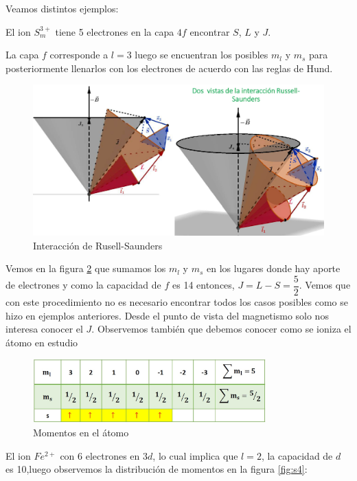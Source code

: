 Veamos distintos ejemplos:

El ion $S_{m}^{3+}$ tiene 5 electrones en la capa $4f$ encontrar $S$, $L$ y $J$.

La capa $f$ corresponde a $l=3$ luego se encuentran los posibles $m_{l}$ y $m_{s}$ para
posteriormente llenarlos con los electrones de acuerdo con las reglas de Hund.


\begin{figure}[H]
    \centering
    \includegraphics[width=1.0\textwidth]{./Figures/fig_s2}
	\caption{Interacción de Rusell-Saunders}
	\label{fig:s2}
\end{figure}

Vemos en la figura \ref{fig:s3} que sumamos los $m_{l}$ y $m_{s}$ en los lugares donde hay aporte de electrones y como la capacidad de $f$ es 14 entonces, $J=L-S=\dfrac{5}{2}$. Vemos que con este procedimiento no es necesario encontrar todos los casos posibles como se hizo en ejemplos anteriores. Desde el punto de vista del magnetismo solo nos interesa conocer el $J$. Observemos también que debemos conocer como se ioniza el átomo en estudio

\begin{figure}[H]
    \centering
    \includegraphics[width=0.8\textwidth]{./Figures/fig_s3}
	\caption{Momentos en el átomo}
	\label{fig:s3}
\end{figure}

El ion $Fe^{2+}$ con 6 electrones en $3d$, lo cual implica que $l=2$, la capacidad de $d$ es 10,luego observemos la distribución de momentos en la figura \ref{fig:s4}:

